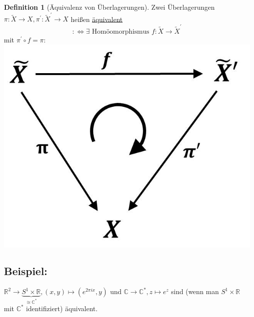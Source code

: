 \documentclass[a4paper,11pt,notitlepage]{report}
\theoremstyle{remark}
\theoremstyle{definition}
\newtheorem{definition}{Definition}[chapter]
\newcommand{\R}{{\ensuremath{\mathbb{R}}}}
\newcommand{\C}{{\ensuremath{\mathbb{C}}}}
\newenvironment{bsp}[1]
{
\setlength{\fboxsep}{10pt}
\subsection*{Beispiel: #1}
\begin{upshape}
}
{
\end{upshape}
}
\begin{document}
\begin{definition}[Äquivalenz von Überlagerungen]
	Zwei Überlagerungen $\pi \colon \tilde{X} \rightarrow X, \pi^\prime \colon \tilde{X}^\prime \rightarrow X$ heißen \underline{äquivalent}
	$$:\Leftrightarrow \exists \text{ Homöomorphismus } f \colon \tilde{X} \rightarrow \tilde{X}^\prime$$
	mit $\pi^\prime \circ f = \pi:$
	\newline \includegraphics[scale=0.4]{images/Aequivalenz_Ueberlagerungen.jpg}
\end{definition}

\begin{bsp}{}
	$\R^2 \rightarrow \underbrace{S^1 \times \R}_{\cong \C^*}, (x,y) \mapsto (e^{2 \pi i x}, y)$
	und $\C \rightarrow \C^*, z \mapsto e^z$
	sind (wenn man $S^1 \times \R$ mit $\C^*$ identifiziert) äquivalent.
\end{bsp}

\end{document}
